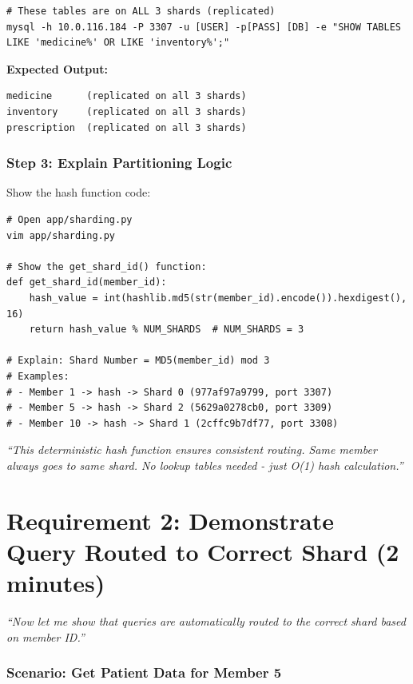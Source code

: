\documentclass[12pt]{article}
\begin{document}
\begin{lstlisting}
# These tables are on ALL 3 shards (replicated)
mysql -h 10.0.116.184 -P 3307 -u [USER] -p[PASS] [DB] -e "SHOW TABLES LIKE 'medicine%' OR LIKE 'inventory%';"
\end{lstlisting}

\textbf{Expected Output:}
\begin{lstlisting}
medicine      (replicated on all 3 shards)
inventory     (replicated on all 3 shards)
prescription  (replicated on all 3 shards)
\end{lstlisting}

\subsubsection*{Step 3: Explain Partitioning Logic}

Show the hash function code:

\begin{lstlisting}
# Open app/sharding.py
vim app/sharding.py

# Show the get_shard_id() function:
def get_shard_id(member_id):
    hash_value = int(hashlib.md5(str(member_id).encode()).hexdigest(), 16)
    return hash_value % NUM_SHARDS  # NUM_SHARDS = 3

# Explain: Shard Number = MD5(member_id) mod 3
# Examples:
# - Member 1 -> hash -> Shard 0 (977af97a9799, port 3307)
# - Member 5 -> hash -> Shard 2 (5629a0278cb0, port 3309)
# - Member 10 -> hash -> Shard 1 (2cffc9b7df77, port 3308)
\end{lstlisting}

\textit{``This deterministic hash function ensures consistent routing. Same member always goes to same shard. No lookup tables needed - just O(1) hash calculation.''}

\newpage

\section{Requirement 2: Demonstrate Query Routed to Correct Shard (2 minutes)}

\textit{``Now let me show that queries are automatically routed to the correct shard based on member ID.''}

\subsubsection*{Scenario: Get Patient Data for Member 5}
\end{document}
